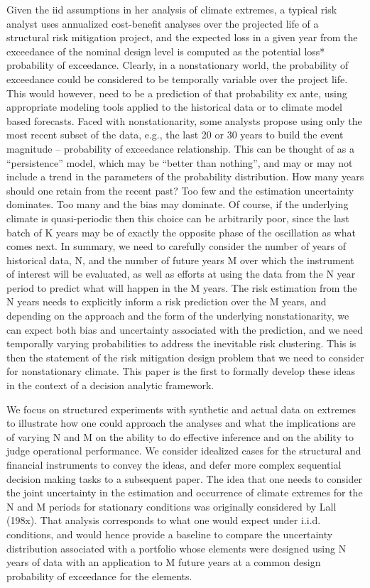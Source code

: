 \documentclass[12pt]{article}
\begin{document}
Given the \gls{iid} assumptions in her analysis of climate extremes, a typical risk analyst uses annualized cost-benefit analyses over the projected life of a structural risk mitigation project, and the expected loss in a given year from the exceedance of the nominal design level is computed as the potential loss* probability of exceedance. Clearly, in a nonstationary world, the probability of exceedance could be considered to be temporally variable over the project life. This would however, need to be a prediction of that probability ex ante, using appropriate modeling tools applied to the historical data or to climate model based forecasts. Faced with nonstationarity, some analysts propose using only the most recent subset of the data, e.g., the last 20 or 30 years to build the event magnitude – probability of exceedance relationship. This can be thought of as a “persistence” model, which may be “better than nothing”, and may or may not include a trend in the parameters of the probability distribution. How many years should one retain from the recent past? Too few and the estimation uncertainty dominates. Too many and the bias may dominate. Of course, if the underlying climate is quasi-periodic then this choice can be arbitrarily poor, since the last batch of K years may be of exactly the opposite phase of the oscillation as what comes next. In summary, we need to carefully consider the number of years of historical data, N, and the number of future years M over which the instrument of interest will be evaluated, as well as efforts at using the data from the N year period to predict what will happen in the M years. The risk estimation from the N years needs to explicitly inform a risk prediction over the M years, and depending on the approach and the form of the underlying nonstationarity, we can expect both bias and uncertainty associated with the prediction, and we need temporally varying probabilities to address the inevitable risk clustering. This is then the statement of the risk mitigation design problem that we need to consider for nonstationary climate. This paper is the first to formally develop these ideas in the context of a decision analytic framework.

We focus on structured experiments with synthetic and actual data on extremes to illustrate how one could approach the analyses and what the implications are of varying N and M on the ability to do effective inference and on the ability to judge operational performance. We consider idealized cases for the structural and financial instruments to convey the ideas, and defer more complex sequential decision making tasks to a subsequent paper. The idea that one needs to consider the joint uncertainty in the estimation and occurrence of climate extremes for the N and M periods for stationary conditions was originally considered by Lall (198x). That analysis corresponds to what one would expect under i.i.d. conditions, and would hence provide a baseline to compare the uncertainty distribution associated with a portfolio whose elements were designed using N years of data with an application to M future years at a common design probability of exceedance for the elements. 
\end{document}
